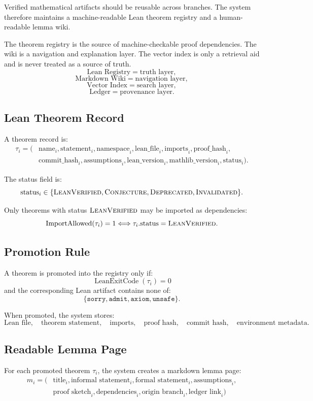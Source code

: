 \documentclass[11pt]{article}
\begin{document}
Verified mathematical artifacts should be reusable across branches. The system therefore maintains a machine-readable Lean theorem registry and a human-readable lemma wiki.

The theorem registry is the source of machine-checkable proof dependencies. The wiki is a navigation and explanation layer. The vector index is only a retrieval aid and is never treated as a source of truth.
$$
\text{Lean Registry} = \text{truth layer},
$$
$$
\text{Markdown Wiki} = \text{navigation layer},
$$
$$
\text{Vector Index} = \text{search layer},
$$
$$
\text{Ledger} = \text{provenance layer}.
$$

\subsection{Lean Theorem Record}
A theorem record is:
$$
\begin{aligned}
\tau_i = ( &\text{name}_i, \text{statement}_i, \text{namespace}_i, \text{lean\_file}_i, \text{imports}_i, \text{proof\_hash}_i, \\
&\text{commit\_hash}_i, \text{assumptions}_i, \text{lean\_version}_i, \text{mathlib\_version}_i, \text{status}_i ). 
\end{aligned}
$$

The status field is:
$$
\text{status}_i \in \{ \textsc{LeanVerified}, \textsc{Conjecture}, \textsc{Deprecated}, \textsc{Invalidated} \}.
$$

Only theorems with status $\textsc{LeanVerified}$ may be imported as dependencies:
$$
\operatorname{ImportAllowed}(\tau_i)=1 \Longleftrightarrow \tau_i.\text{status}=\textsc{LeanVerified}.
$$

\subsection{Promotion Rule}
A theorem is promoted into the registry only if:
$$
\operatorname{LeanExitCode}(\tau_i)=0
$$
and the corresponding Lean artifact contains none of:
$$
\{\texttt{sorry},\texttt{admit},\texttt{axiom},\texttt{unsafe}\}.
$$

When promoted, the system stores:
$$
\text{Lean file},\quad \text{theorem statement},\quad \text{imports},\quad \text{proof hash},\quad \text{commit hash},\quad \text{environment metadata}.
$$

\subsection{Readable Lemma Page}
For each promoted theorem $\tau_i$, the system creates a markdown lemma page:
$$
\begin{aligned}
m_i = ( & \text{title}_i, \text{informal statement}_i, \text{formal statement}_i, \text{assumptions}_i, \\
& \text{proof sketch}_i, \text{dependencies}_i, \text{origin branch}_i, \text{ledger link}_i )
\end{aligned}
$$
\end{document}
